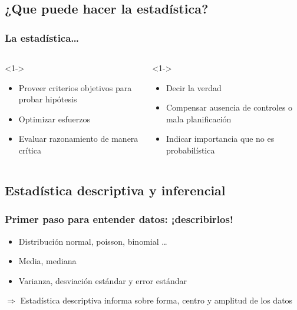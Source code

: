 \documentclass[gray,handout,mathserif]{beamer}
\begin{document}
\subsection[¿Qu\'e puede hacer la esat\'istica?]{¿Que puede hacer la estad\'istica?}

\begin{frame}[label=can-not]
   \frametitle{La estad\'istica\ldots}
   \begin{columns}[t, totalwidth=10cm]
   \begin{column}[]{4.8cm}
     \begin{block}{}<1->
     \begin{itemize}[<1-| uncover@+| handout:1>]
       \item Proveer criterios objetivos para probar hip\'otesis
       \item Optimizar esfuerzos
       \item Evaluar razonamiento de manera cr\'itica
     \end{itemize}
     \end{block}
   \end{column}
   \begin{column}[]{4.8cm}
   \begin{block}{}<1->
     \begin{itemize}[<1-| uncover@+| handout:1>]
       \item Decir la verdad
       \item Compensar ausencia de controles o mala planificaci\'on
       \item Indicar importancia que no es probabil\'istica
     \end{itemize}
   \end{block}
   \end{column}
     \end{columns}
\end{frame}%


\subsection[Descriptiva / inferencial]{Estad\'istica descriptiva y inferencial}

\begin{frame}[label=desc]
\frametitle{Primer paso para entender datos: ¡describirlos!}
 \begin{itemize}
   \item Distribuci\'on normal, poisson, binomial \ldots
   \item Media, mediana
   \item Varianza, desviaci\'on est\'andar y error est\'andar
 \end{itemize}
 \medskip
 \hspace{1em} $\Rightarrow$ Estad\'istica \alert{descriptiva} informa sobre forma, centro y amplitud de los datos
\end{frame}%
\end{document}
